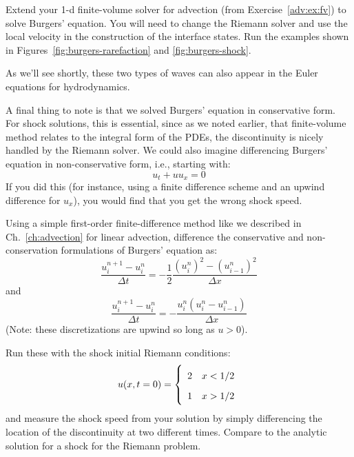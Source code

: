 \begin{exercise}
{Extend your 1-d finite-volume solver for advection (from
  Exercise~\ref{adv:ex:fv}) to solve Burgers' equation.  You will
  need to change the Riemann solver and use the local velocity in the
  construction of the interface states.  Run the examples shown in
  Figures~\ref{fig:burgers-rarefaction} and \ref{fig:burgers-shock}}.
\end{exercise}

As we'll see shortly, these two types of waves can also appear in the Euler equations
for hydrodynamics.

A final thing to note is that we solved Burgers' equation in conservative form.
For shock solutions, this is essential, since as we noted earlier, that finite-volume
method relates to the integral form of the PDEs, the discontinuity is nicely handled
by the Riemann solver.  We could also imagine differencing Burgers' equation in
non-conservative form, i.e., starting with:
\begin{equation}
u_t + u u_x = 0
\end{equation}
If you did this (for instance, using a finite difference scheme and an
upwind difference for $u_x$), you would find that you get the wrong
shock speed.

\begin{exercise}
{
Using a simple first-order finite-difference method like we described
in Ch.~\ref{ch:advection} for linear advection, difference the
conservative and non-conservation formulations of Burgers' equation
as:
\begin{equation}
\frac{u^{n+1}_i - u^n_i}{\Delta t} =
   -\frac{1}{2} \frac{(u^n_i)^2 - (u^n_{i-1})^2}{\Delta x}
\end{equation}
and
\begin{equation}
  \frac{u_{i}^{n+1} - u_i^n}{\Delta t} = -
      \frac{u_i^n (u_i^n - u_{i-1}^n)}{\Delta x}
\end{equation}
(Note: these discretizations are upwind so long as $u > 0$).

Run these with the shock initial Riemann conditions:
\begin{equation}
\renewcommand{\arraystretch}{1.75}
u(x, t=0) = \left \{ \begin{array}{cc}
    2   & x < 1/2 \\
    1   & x > 1/2
\end{array}
\right .
\renewcommand{\arraystretch}{1.0}
\end{equation}
and measure the shock speed from your solution by simply differencing
the location of the discontinuity at two different times.  Compare to
the analytic solution for a shock for the Riemann problem.}
\end{exercise}

